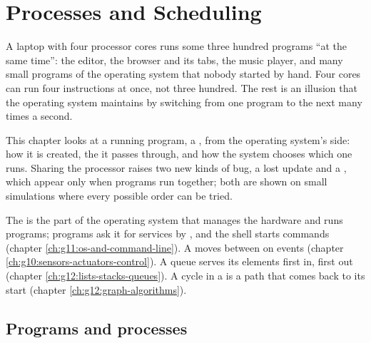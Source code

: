 \chapter{Processes and Scheduling}\label{ch:g12:processes-and-scheduling}

A laptop with four processor cores runs some three hundred programs ``at the same time'': the editor, the browser and
its tabs, the music player, and many small programs of the operating system that nobody started by hand. Four cores
can run four instructions at once, not three hundred. The rest is an illusion that the operating system maintains by
switching from one program to the next many times a second.

This chapter looks at a running program, a , from the operating system's side: how it is created, the 
it passes through, and how the system chooses which one runs. Sharing the processor raises two new kinds of bug, a
lost update and a , which appear only when programs run together; both are shown on small simulations where
every possible order can be tried.

\begin{recall}
The  is the part of the operating system that manages the hardware and runs programs; programs ask it for
services by , and the shell starts commands (chapter \ref{ch:g11:os-and-command-line}). A 
moves between  on events (chapter \ref{ch:g10:sensors-actuators-control}). A queue serves its elements first in,
first out (chapter \ref{ch:g12:lists-stacks-queues}). A cycle in a  is a path that comes back to its
start (chapter \ref{ch:g12:graph-algorithms}).
\end{recall}

\section{Programs and processes}\label{sec:g12:processes-and-scheduling:process}


